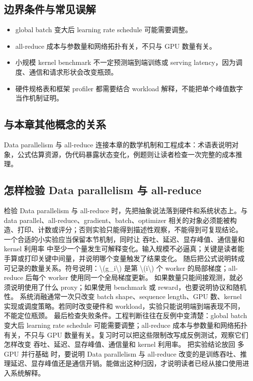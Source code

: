 \documentclass[a4paper]{article}
\begin{document}
\subsection{边界条件与常见误解}
\begin{itemize}
\item global batch 变大后 learning rate schedule 可能需要调整。
\item all-reduce 成本与参数量和网络拓扑有关，不只与 GPU 数量有关。
\item 小规模 kernel benchmark 不一定预测端到端训练或 serving latency，因为调度、通信和请求形状会改变瓶颈。
\item 硬件规格表和框架 profiler 都需要结合 workload 解释，不能把单个峰值数字当作机制证明。
\end{itemize}
\subsection{与本章其他概念的关系}
Data parallelism 与 all-reduce 连接本章的数学机制和工程成本：术语表说明对象，公式估算资源，伪代码暴露状态变化，例题则让读者检查一次完整的成本推理。
\subsection{怎样检验 Data parallelism 与 all-reduce}
检验 Data parallelism 与 all-reduce 时，先把抽象说法落到硬件和系统状态上。与 data parallel、all-reduce、gradient、batch、optimizer 相关的对象必须能被构造、打印、计数或评分；否则实验只能得到描述性观察，不能得到可复现结论。
一个合适的小实验应当保留本节机制，同时让 吞吐、延迟、显存峰值、通信量和 kernel 利用率 中至少一个量发生可解释变化。输入规模不必逼真；关键是读者能手算或打印关键中间量，并说明哪个变量触发了结果变化。
随后把公式说明转成可记录的数量关系。符号说明：\textbackslash{}(g\_i\textbackslash{}) 是第 \textbackslash{}(i\textbackslash{}) 个 worker 的局部梯度；all-reduce 后每个 worker 使用同一个全局梯度更新。 如果数量只能间接观测，就必须说明使用了什么 proxy；如果使用 benchmark 或 reward，也要说明协议和随机性。
系统消融通常一次只改变 batch shape、sequence length、GPU 数、kernel 实现或调度策略。若同时改变硬件和 workload，实验只能说明端到端表现不同，不能定位瓶颈。
最后检查失败条件。工程判断往往在反例中变清楚：global batch 变大后 learning rate schedule 可能需要调整；all-reduce 成本与参数量和网络拓扑有关，不只与 GPU 数量有关。复习时可以把这些限制改写成反例测试，观察它们怎样改变 吞吐、延迟、显存峰值、通信量和 kernel 利用率。
把实验结论放回 多 GPU 并行基础 时，要说明 Data parallelism 与 all-reduce 改变的是训练吞吐、推理延迟、显存峰值还是通信开销。能做出这种归因，才说明读者已经从接口使用进入系统解释。
\end{document}
